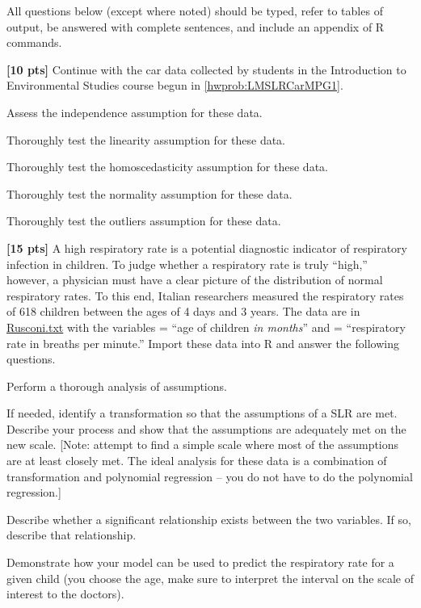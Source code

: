 \documentclass[10pt,openany]{book}\usepackage[]{graphicx}\usepackage[]{color}
\begin{document}
\begin{hwsection}{All questions below (except where noted) should be typed, refer to tables of output, be answered with complete sentences, and include an appendix of R commands.}
\vspace{30pt}
  \item \label{hwprob:LMSLRCarMPG2} \textbf{[10 pts]} Continue with the car data collected by students in the Introduction to Environmental Studies course begun in \ref{hwprob:LMSLRCarMPG1}.
    \begin{Enumerate}
      \item Assess the independence assumption for these data.
      \item Thoroughly test the linearity assumption for these data.
      \item Thoroughly test the homoscedasticity assumption for these data.
      \item Thoroughly test the normality assumption for these data.
      \item Thoroughly test the outliers assumption for these data.
    \end{Enumerate}

\vspace{30pt}
  \item \label{hwprob:LMSLRRusconi} \textbf{[15 pts]} A high respiratory rate is a potential diagnostic indicator of respiratory infection in children.  To judge whether a respiratory rate is truly ``high,'' however, a physician must have a clear picture of the distribution of normal respiratory rates.  To this end, Italian researchers \citep{Rusconietal1994} measured the respiratory rates of 618 children between the ages of 4 days and 3 years.  The data are in \href{https://sites.google.com/site/ncstats/data/Rusconi.txt}{Rusconi.txt} with the variables  = ``age of children \emph{in months}'' and  = ``respiratory rate in breaths per minute.''  Import these data into R and answer the following questions.
    \begin{Enumerate}
      \item Perform a thorough analysis of assumptions.
      \item If needed, identify a transformation so that the assumptions of a SLR are met.  Describe your process and show that the assumptions are adequately met on the new scale. [Note: attempt to find a simple scale where most of the assumptions are at least closely met.  The ideal analysis for these data is a combination of transformation and polynomial regression -- you do not have to do the polynomial regression.]
      \item Describe whether a significant relationship exists between the two variables.  If so, describe that relationship.
      \item Demonstrate how your model can be used to predict the respiratory rate for a given child (you choose the age, make sure to interpret the interval on the scale of interest to the doctors).
    \end{Enumerate}

\end{hwsection}
\end{document}
